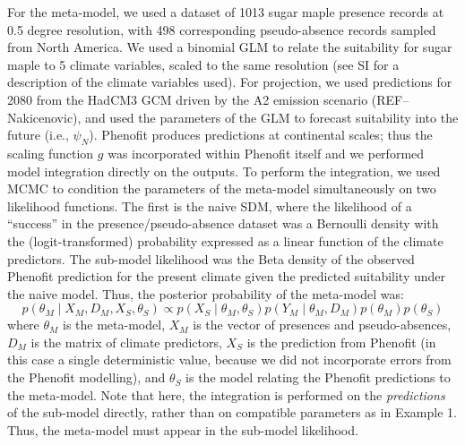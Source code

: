For the meta-model, we used a dataset of 1013 sugar maple presence records at 0.5 degree resolution, with 498 corresponding pseudo-absence records sampled from North America.
We used a binomial GLM to relate the suitability for sugar maple to 5 climate variables, scaled to the same resolution (see SI for a description of the climate variables used).
For projection, we used predictions for 2080 from the HadCM3 GCM \citep{Pope2000} driven by the A2 emission scenario (REF--Nakicenovic), and used the parameters of the GLM to forecast suitability into the future (i.e., \(\psi_N\)).
Phenofit produces predictions at continental scales; thus the scaling function \(g\) was incorporated within Phenofit itself and we performed model integration directly on the outputs.
To perform the integration, we used \ac{MCMC} to condition the parameters of the meta-model simultaneously on two likelihood functions.
The first is the naive SDM, where the likelihood of a ``success'' in the presence/pseudo-absence dataset was a Bernoulli density with the (logit-transformed) probability expressed as a linear function of the climate predictors.
The sub-model likelihood was the Beta density of the observed Phenofit prediction for the present climate given the predicted suitability under the naive model. 
Thus, the posterior probability of the meta-model was:
\begin{equation}
\label{eq:integrated2}
	p( \theta_M \mid X_M, D_M, X_S, \theta_S )
	\propto 
	p( X_S \mid \theta_M, \theta_S )
	p( Y_M \mid \theta_M, D_M ) 
	p( \theta_M )
	p( \theta_S )
\end{equation}
where \(\theta_M\) is the meta-model, 
\(X_M\) is the vector of presences and pseudo-absences, 
\(D_M\) is the matrix of climate predictors,
\(X_S\) is the prediction from Phenofit (in this case a single deterministic value, because we did not incorporate errors from the Phenofit modelling),
and \(\theta_S\) is the model relating the Phenofit predictions to the meta-model.
Note that here, the integration is performed on the \emph{predictions} of the sub-model directly, rather than on compatible parameters as in Example 1. Thus, the meta-model must appear in the sub-model likelihood.

